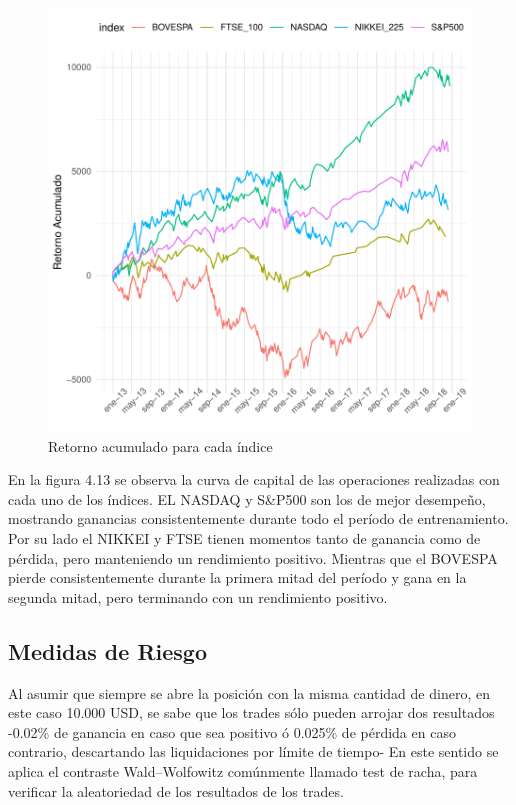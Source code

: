 \documentclass[a4paper,12pt]{Latex/Classes/PhDthesisPSnPDF}
\begin{document}
\begin{figure}[H]
\centering
\includegraphics{main-031}
\caption{Retorno acumulado para cada índice}
\end{figure}

En la figura 4.13 se observa la curva de capital de las operaciones realizadas con cada uno de los índices. EL NASDAQ y S\&P500 son los de mejor desempeño, mostrando ganancias consistentemente durante todo el período de entrenamiento. Por su lado el NIKKEI y FTSE tienen momentos tanto de ganancia como de pérdida, pero manteniendo un rendimiento positivo. Mientras que el BOVESPA pierde consistentemente durante la primera mitad del período y gana en la segunda mitad, pero terminando con un rendimiento positivo.

\subsection{Medidas de Riesgo}

Al asumir que siempre se abre la posición con la misma cantidad de dinero, en este caso 10.000 USD, se sabe que los trades sólo pueden arrojar dos resultados -0.02\% de ganancia en caso que sea positivo ó 0.025\% de pérdida en caso contrario, descartando las liquidaciones por límite de tiempo- En este sentido se aplica el contraste Wald–Wolfowitz comúnmente llamado test de racha, para verificar la aleatoriedad de los resultados de los trades.
\end{document}
